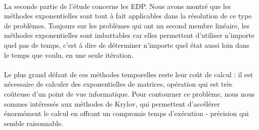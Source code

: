     \paragraph{}
    La seconde partie de l'étude concerne les EDP. Nous avons montré que les méthodes exponentielles sont tout à fait applicables dans la résolution de ce type de problèmes. Toujours sur les problèmes qui ont un second membre linéaire, les méthodes exponentielles sont imbattables car elles permettent d'utiliser n'importe quel pas de temps, c'est à dire de déterminer n'importe quel état aussi loin dans le temps que voulu, en une seule itération.

    \paragraph{}
    Le plus grand défaut de ces méthodes temporelles reste leur coût de calcul : il est nécessaire de calculer des exponentielles de matrices, opération qui est très coûteuse d'un point de vue informatique. Pour contourner ce problème, nous nous sommes intéressés aux méthodes de Krylov, qui permettent d'accélérer énormément le calcul en offrant un compromis temps d'exécution - précision qui semble raisonnable.

